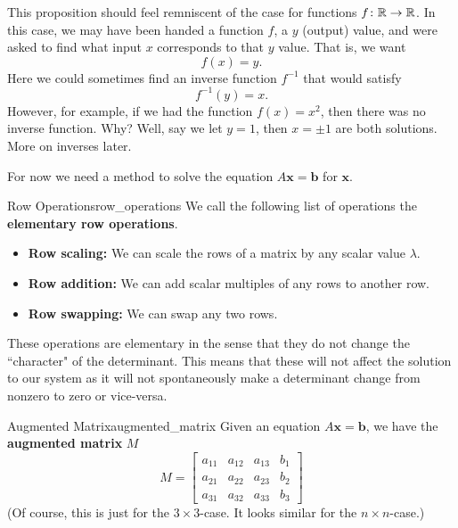         This proposition should feel remniscent of the case for functions $f\colon \mathbb{R}\to \mathbb{R}$.  In this case, we may have been handed a function $f$, a $y$ (output) value, and were asked to find what input $x$ corresponds to that $y$ value. That is, we want
        \[
        f(x)=y.
        \]
        Here we could sometimes find an inverse function $f^{-1}$ that would satisfy
        \[
        f^{-1}(y)=x.
        \]
        However, for example, if we had the function $f(x)=x^2$, then there was no inverse function.  Why? Well, say we let $y=1$, then $x=\pm 1$ are both solutions. More on inverses later.  
        
        For now we need a method to solve the equation $A\mathbf{x}=\mathbf{b}$ for $\mathbf{x}$. 
        
        \begin{df}{Row Operations}{row_operations}
        We call the following list of operations the \textbf{elementary row operations}.
        \begin{itemize}
            \item \textbf{Row scaling:} We can scale the rows of a matrix by any scalar value $\lambda$.
            \item \textbf{Row addition:} We can add scalar multiples of any rows to another row.
            \item \textbf{Row swapping:} We can swap any two rows.
        \end{itemize}
        These operations are elementary in the sense that they do not change the ``character" of the determinant.  This means that these will not affect the solution to our system as it will not spontaneously make a determinant change from nonzero to zero or vice-versa.  
        \end{df}
        
        \begin{df}{Augmented Matrix}{augmented_matrix}
        Given an equation $A\mathbf{x}=\mathbf{b}$, we have the \textbf{augmented matrix}  $M$
        \[
        M=\left[\begin{array}{ccc|c}
        a_{11} & a_{12} & a_{13}  &  b_1 \\
        a_{21} & a_{22} & a_{23} & b_2\\
        a_{31} & a_{32} & a_{33} & b_3
        \end{array}\right]
        \]
        (Of course, this is just for the $3\times 3$-case.  It looks similar for the $n\times n$-case.)
        \end{df}
        
